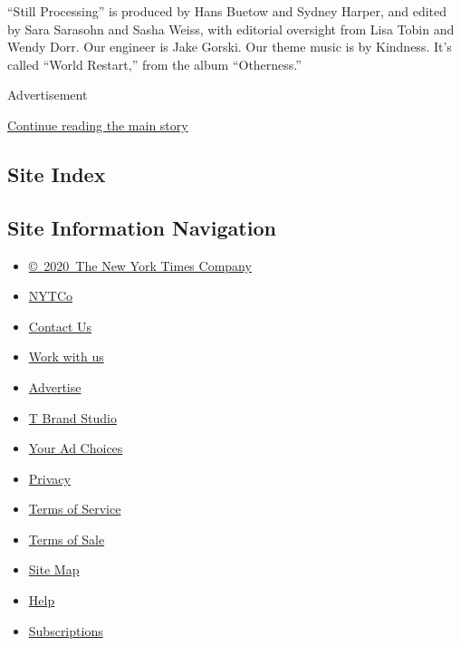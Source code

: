 ``Still Processing'' is produced by Hans Buetow and Sydney Harper, and
edited by Sara Sarasohn and Sasha Weiss, with editorial oversight from
Lisa Tobin and Wendy Dorr. Our engineer is Jake Gorski. Our theme music
is by Kindness. It's called ``World Restart,'' from the album
``Otherness.''

Advertisement

\protect\hyperlink{after-bottom}{Continue reading the main story}

\hypertarget{site-index}{%
\subsection{Site Index}\label{site-index}}

\hypertarget{site-information-navigation}{%
\subsection{Site Information
Navigation}\label{site-information-navigation}}

\begin{itemize}
\tightlist
\item
  \href{https://help.nytimes.com/hc/en-us/articles/115014792127-Copyright-notice}{©~2020~The
  New York Times Company}
\end{itemize}

\begin{itemize}
\tightlist
\item
  \href{https://www.nytco.com/}{NYTCo}
\item
  \href{https://help.nytimes.com/hc/en-us/articles/115015385887-Contact-Us}{Contact
  Us}
\item
  \href{https://www.nytco.com/careers/}{Work with us}
\item
  \href{https://nytmediakit.com/}{Advertise}
\item
  \href{http://www.tbrandstudio.com/}{T Brand Studio}
\item
  \href{https://www.nytimes.com/privacy/cookie-policy\#how-do-i-manage-trackers}{Your
  Ad Choices}
\item
  \href{https://www.nytimes.com/privacy}{Privacy}
\item
  \href{https://help.nytimes.com/hc/en-us/articles/115014893428-Terms-of-service}{Terms
  of Service}
\item
  \href{https://help.nytimes.com/hc/en-us/articles/115014893968-Terms-of-sale}{Terms
  of Sale}
\item
  \href{https://spiderbites.nytimes.com}{Site Map}
\item
  \href{https://help.nytimes.com/hc/en-us}{Help}
\item
  \href{https://www.nytimes.com/subscription?campaignId=37WXW}{Subscriptions}
\end{itemize}
